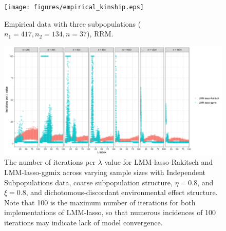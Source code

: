 \begin{figure}[H]
    \centering
    \texttt{[image: figures/empirical\_kinship.eps]}
    \caption{Empirical data with three subpopulations ($n_1=417, n_2 = 134, n = 37$), RRM.}
    \label{fig:empirical}
\end{figure}

\begin{figure}[H]
    \centering
    \includegraphics[width=\textwidth]{figures/niter_perLambda_point.png}
    \caption{The number of iterations per $\lambda$ value for LMM-lasso-Rakitsch and LMM-lasso-ggmix across varying sample sizes with Independent Subpopulations data, coarse subpopulation structure, $\eta = 0.8$, and $\xi = 0.8$, and dichotomous-discordant environmental effect structure. Note that 100 is the maximum number of iterations for both implementations of LMM-lasso, so that numerous incidences of 100 iterations may indicate lack of model convergence.}
    \label{fig:niter}
\end{figure}
